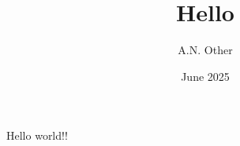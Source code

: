 \documentclass{article}
\title{Hello}
\author{A.N. Other}
\date{June 2025}
\begin{document}
   \maketitle
   Hello world!!
\end{document}
